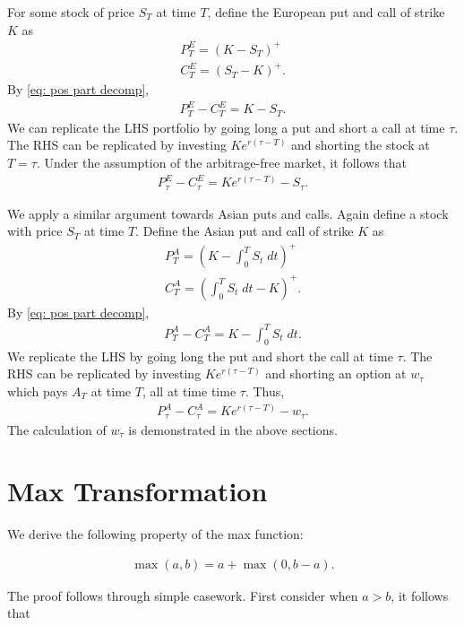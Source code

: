 \documentclass[reqno]{amsart}
\begin{document}
For some stock of price $S_T$ at time $T$, define the European put and call of strike $K$ as 
\begin{align} 
     P^E_T = (K - S_T)^+ \\
     C^E_T = (S_T - K)^+.
\end{align}
By \eqref{eq: pos part decomp}, 
\begin{align} 
     P^E_T - C^E_T = K - S_T.
\end{align}
We can replicate the LHS portfolio by going long a put and short a call at time $\tau$. The RHS can be replicated by investing $Ke^{r(\tau - T)}$ and shorting the stock at $T = \tau$.
Under the assumption of the arbitrage-free market, it follows that
\begin{align} 
     P^E_\tau - C^E_\tau = Ke^{r(\tau - T)} - S_\tau.
\end{align}

We apply a similar argument towards Asian puts and calls. Again define a stock with price $S_T$ at time $T$. Define the Asian put and call of strike $K$ as
\begin{align} 
     P^A_T = (K - \int_0^T S_t \;dt)^+ \\
     C^A_T = (\int_0^T S_t \;dt - K)^+.
\end{align}
By \eqref{eq: pos part decomp}, 
\begin{align} 
     P^A_T - C^A_T = K - \int_0^T S_t \;dt.
\end{align}
We replicate the LHS by going long the put and short the call at time $\tau$. The RHS can be replicated by investing $Ke^{r(\tau - T)}$ and shorting an option at $w_\tau$ which pays $A_T$ at time $T$, all at time time $\tau$.
Thus, 
\begin{align} 
     P^A_\tau - C^A_\tau = Ke^{r(\tau - T)} - w_\tau.
\end{align}
The calculation of $w_\tau$ is demonstrated in the above sections.

\section{Max Transformation}

We derive the following property of the max function:

\begin{align}
     \max(a, b) = a + \max(0, b-a).
\end{align}

The proof follows through simple casework. First consider when $a > b$, it follows that
\end{document}
